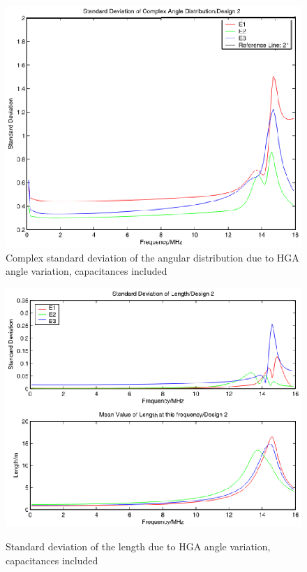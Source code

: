 \documentclass[a4paper,10pt]{thesis}
\begin{document}
\begin{figure}[h]
\begin{center}
\includegraphics[width=12cm]{VirtualSigma1D2HGA_caps.eps}\\
\caption{Complex standard deviation of the angular distribution due to HGA angle variation, capacitances included} \label{fig_VirtualSigma1_HGA_D2_caps}
\includegraphics[width=12cm]{VirtualSigma2D2HGA_caps.eps} \\
\caption{Standard deviation of the length due to HGA angle variation, capacitances included} \label{fig_VirtualSigma2_HGA_D2_caps}
\end{center}
\end{figure}

\newpage
\end{document}
